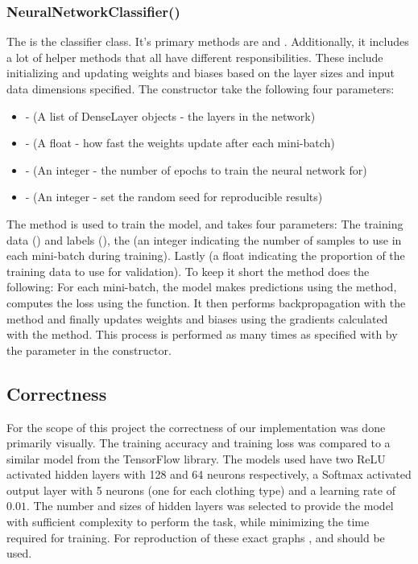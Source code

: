 \subsubsection{NeuralNetworkClassifier()}
The  is the classifier class.
It's primary methods are  and .
Additionally, it includes a lot of helper methods that all have different responsibilities.
These include initializing and updating weights and biases based on the layer sizes and input data dimensions specified.
The constructor take the following four parameters:\\
\begin{itemize}
    \item {} - (A list of DenseLayer objects - the layers in the network)
    \item {} - (A float - how fast the weights update after each mini-batch)
    \item {} - (An integer - the number of epochs to train the neural network for)
    \item {} - (An integer - set the random seed for reproducible results)
    \end{itemize}
\vspace{10pt}


The  method is used to train the model, and takes four parameters:
The training data () and labels (), the  (an integer indicating the number of samples to use in each mini-batch during training).
Lastly  (a float indicating the proportion of the training data to use for validation).
To keep it short the  method does the following:
For each mini-batch, the model makes predictions using the  method, computes the loss using the  function.
It then performs backpropagation with the  method and finally updates weights and biases using the gradients calculated with the  method.
This process is performed as many times as specified with by the  parameter in the constructor.

\subsection{Correctness}
For the scope of this project the correctness of our implementation was done primarily visually.
The training accuracy and training loss was compared to a similar model from the TensorFlow library.
The models used have two ReLU activated hidden layers with 128 and 64 neurons respectively, a Softmax activated output layer with 5 neurons (one for each clothing type) and a learning rate of $0.01$.
The number and sizes of hidden layers was selected to provide the model with sufficient complexity to perform the task, while minimizing the time required for training.
For reproduction of these exact graphs , and  should be used. \\

